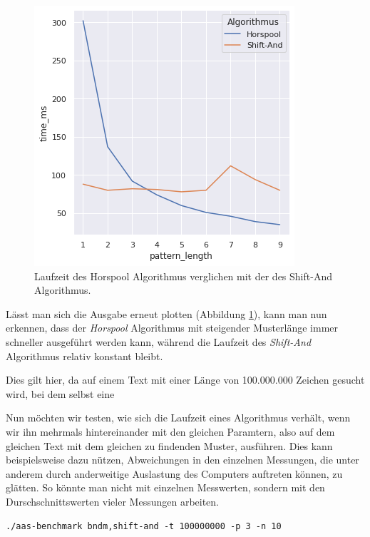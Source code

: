 \documentclass[twocolumn]{article}
\begin{document}
\begin{figure}
    \includegraphics[width=\linewidth]{assets/graph_2.png}
    \caption{Laufzeit des Horspool Algorithmus verglichen mit der des Shift-And Algorithmus.}
    \label{fig:runtime_horspool_shift_and}
\end{figure}

Lässt man sich die Ausgabe erneut plotten (Abbildung \ref{fig:runtime_horspool_shift_and}), kann man nun erkennen, dass der \textit{Horspool} Algorithmus mit steigender Musterlänge immer schneller ausgeführt werden kann, während die Laufzeit des \textit{Shift-And} Algorithmus relativ konstant bleibt.

Dies gilt hier, da auf einem Text mit einer Länge von 100.000.000 Zeichen gesucht wird, bei dem selbst eine 

Nun möchten wir testen, wie sich die Laufzeit eines Algorithmus verhält, wenn wir ihn mehrmals hintereinander mit den gleichen Paramtern, also auf dem gleichen Text mit dem gleichen zu findenden Muster, ausführen. Dies kann beispielsweise dazu nützen, Abweichungen in den einzelnen Messungen, die unter anderem durch anderweitige Auslastung des Computers auftreten können, zu glätten. So könnte man nicht mit einzelnen Messwerten, sondern mit den Durschschnittswerten vieler Messungen arbeiten.

\begin{lstlisting}[breaklines=true,autogobble=true]
    ./aas-benchmark bndm,shift-and -t 100000000 -p 3 -n 10
\end{lstlisting}
\end{document}
